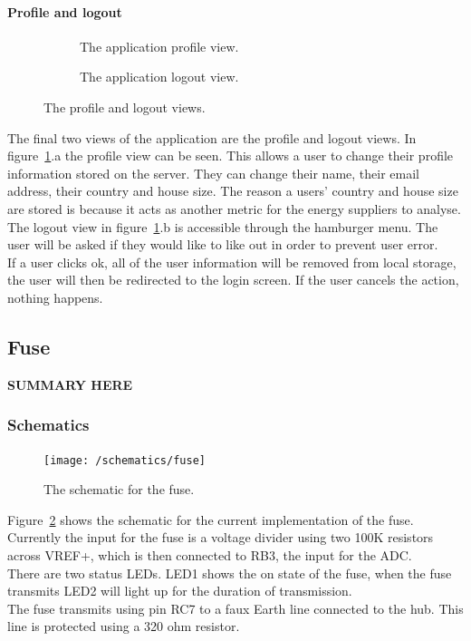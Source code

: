 \documentclass[draft,preprint,12pt,3p]{elsarticle}
\begin{document}
\paragraph{Profile and logout}
\begin{figure}[H]
    \centering
    \begin{subfigure}[t]{0.32\columnwidth}
        \centering
        \caption{The application profile view.}
    \end{subfigure}
    \begin{subfigure}[t]{0.32\columnwidth}
        \centering
        \caption{The application logout view.}
    \end{subfigure}
    \caption{The profile and logout views.}
    \label{fig:profilelogout}
\end{figure}
The final two views of the application are the profile and logout views.
In figure~\ref{fig:profilelogout}.a the profile view can be seen. This allows a user to change their profile information stored on the server. They can change their name, their email address, their country and house size. The reason a users' country and house size are stored is because it acts as another metric for the energy suppliers to analyse.\\
The logout view in figure~\ref{fig:profilelogout}.b is accessible through the hamburger menu. The user will be asked if they would like to like out in order to prevent user error.\\
If a user clicks ok, all of the user information will be removed from local storage, the user will then be redirected to the login screen. If the user cancels the action, nothing happens. 

\subsection{Fuse}
\textbf{SUMMARY HERE}
\subsubsection{Schematics}
\begin{figure}[H]
    \centering
    \texttt{[image: /schematics/fuse]}
    \caption{The schematic for the fuse.}
    \label{fig:fuseschematic}
\end{figure}
Figure~\ref{fig:fuseschematic} shows the schematic for the current implementation of the fuse.\\
Currently the input for the fuse is a voltage divider using two 100K resistors across VREF+, which is then connected to RB3, the input for the ADC.\\
There are two status LEDs. LED1 shows the on state of the fuse, when the fuse transmits LED2 will light up for the duration of transmission.\\
The fuse transmits using pin RC7 to a faux Earth line connected to the hub. This line is protected using a 320 ohm resistor.
\end{document}
